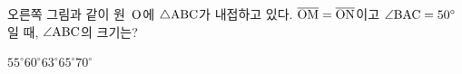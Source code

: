 \noindent\begin{minipage}[t]{0.58\linewidth}\vspace{0pt}\raggedright 오른쪽 그림과 같이 원~$\mathrm{O}$에 $\triangle\mathrm{ABC}$가 내접하고 있다. $\overline{\mathrm{OM}}=\overline{\mathrm{ON}}$이고 $\angle\mathrm{BAC}=50^\circ$일 때, $\angle\mathrm{ABC}$의 크기는?\end{minipage}\hfill\begin{minipage}[t]{0.4\linewidth}\vspace{0pt}\centering \resizebox{\ifdim\width>\linewidth\linewidth\else\width\fi}{!}{}\end{minipage}\par
\begin{choicesii}{$55^\circ$}{$60^\circ$}{$63^\circ$}{$65^\circ$}{$70^\circ$}\end{choicesii}

